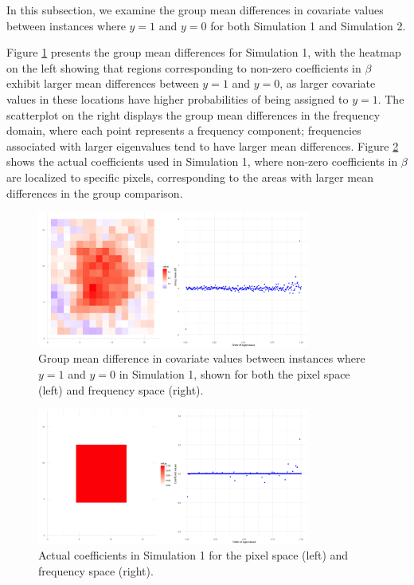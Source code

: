 \documentclass[12pt]{article}
\begin{document}
In this subsection, we examine the group mean differences in covariate values between instances where \( y = 1 \) and \( y = 0 \) for both Simulation 1 and Simulation 2.

Figure \ref{fig:group_diff1} presents the group mean differences for Simulation 1, with the heatmap on the left showing that regions corresponding to non-zero coefficients in \( \beta \) exhibit larger mean differences between \( y = 1 \) and \( y = 0 \), as larger covariate values in these locations have higher probabilities of being assigned to \( y = 1 \). The scatterplot on the right displays the group mean differences in the frequency domain, where each point represents a frequency component; frequencies associated with larger eigenvalues tend to have larger mean differences. Figure \ref{fig:coefs_sim1} shows the actual coefficients used in Simulation 1, where non-zero coefficients in \( \beta \) are localized to specific pixels, corresponding to the areas with larger mean differences in the group comparison.

\begin{figure}[h!]
	\centering
  \includegraphics[width=0.8\textwidth, height=0.35\textwidth]{group_mean_diff_sim1.png}
	\caption{Group mean difference in covariate values between instances where \( y = 1 \) and \( y = 0 \) in Simulation
		1, shown for both the pixel space (left) and frequency space (right).}
	\label{fig:group_diff1}
\end{figure}

\begin{figure}[h!]
	\centering
	\includegraphics[width=0.8\textwidth, height=0.35\textwidth]{actual_coefs_sim1.png}
	\caption{Actual coefficients in Simulation 1 for the pixel space (left) and frequency space (right).}
	\label{fig:coefs_sim1}
\end{figure}
\end{document}
